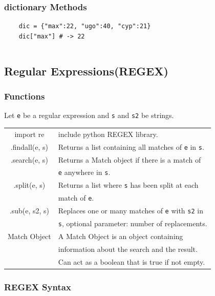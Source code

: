 \documentclass[5pt]{article}
\begin{document}
\begin{multicols}{2}
\subsubsection{dictionary Methods}
\begin{verbatim}
    dic = {"max":22, "ugo":40, "cyp":21}
    dic["max"] # -> 22
\end{verbatim}
\begin{tabular}{C L}

\end{tabular}

\subsection{Regular Expressions(REGEX)}
\subsubsection{Functions}
Let \texttt{e} be a regular expression and \texttt{s} and \texttt{s2} be strings.
\begin{tabular}{C L}
    import re               & include python REGEX library.\\
    .findall(e, s)          & Returns a list containing all matches of \texttt{e} in \texttt{s}.\\
    .search(e, s)           & Returns a Match object if there is a match of\\
                            & \texttt{e}  anywhere in \texttt{s}.\\
    .split(e, s)            & Returns a list where \texttt{s} has been split at each\\
                            & match of \texttt{e}.\\
    .sub(e, s2, s)          & Replaces one or many matches of \texttt{e} with \texttt{s2} in\\
                            & \texttt{s}, \small{optional parameter: number of replacements.}\\
    Match Object            & A Match Object is an object containing\\
                            & information about the search and the result.\\
                            & \small{Can act as a boolean that is true if not empty.}\\
\end{tabular}
\subsubsection{REGEX Syntax}



\end{multicols}
\end{document}
